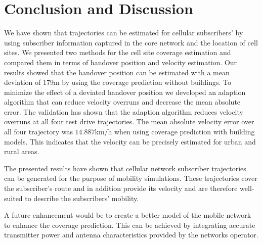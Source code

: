 \section{Conclusion and Discussion}
We have shown that trajectories can be estimated for cellular subscribers' by using subscriber information captured in the core network and the location of cell sites. We presented two methods for the cell site coverage estimation and compared them in terms of handover position and velocity estimation. Our results showed that the handover position can be estimated with a mean deviation of 179m by using the coverage prediction without buildings. To minimize the effect of a deviated handover position we developed an adaption algorithm that can reduce velocity overruns and decrease the mean absolute error. The validation has shown that the adaption algorithm reduces velocity overruns at all four test drive trajectories. The mean absolute velocity error over all four trajectory was $14.887$km/h when using coverage prediction with building models. This indicates that the velocity can be precisely estimated for urban and rural areas.

The presented results have shown that cellular network subscriber trajectories can be generated for the purpose of mobility simulations. These trajectories cover the subscriber's route and in addition provide its velocity and are therefore well-suited to describe the subscribers' mobility. %

A future enhancement would be to create a better model of the mobile network to enhance the coverage prediction. This can be achieved by integrating accurate transmitter power and antenna characteristics provided by the networks operator.
